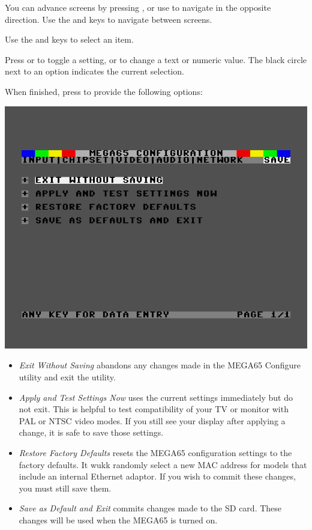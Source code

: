 You can advance screens by pressing , or use  to navigate in the opposite direction. Use the \megakey{$\leftarrow$} and \megakey{$\rightarrow$} keys to navigate between screens.

Use the \megakey{$\uparrow$} and \megakey{$\downarrow$} keys to select an item.

Press  or  to toggle a setting, or to change a text or numeric value. The black circle next to an option indicates the current selection.

When finished, press  to provide the following options:

\includegraphics[width=\linewidth]{images/ss-m65config-save.png}

\begin{itemize}
  \item{\em Exit Without Saving} abandons any changes made in the MEGA65 Configure utility and exit the utility.
  \item{\em Apply and Test Settings Now} uses the current settings immediately but do not exit. This is helpful to test compatibility of your TV or monitor with PAL or NTSC video modes. If you still see your display after applying a change, it is safe to save those settings.
  \item{\em Restore Factory Defaults} resets the MEGA65 configuration settings to the factory defaults. It wukk randomly select a new MAC address for models that include an internal Ethernet adaptor. If you wish to commit these changes, you must still save them.
  \item{\em Save as Default and Exit} commits changes made to the SD card. These changes will be used when the MEGA65 is turned on.
\end{itemize}


